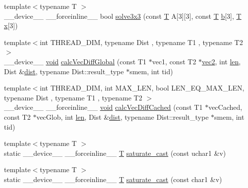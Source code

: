 \begin{DoxyCompactItemize}
\item 
{\footnotesize template$<$typename T $>$ }\\\-\_\-\-\_\-device\-\_\-\-\_\- \-\_\-\-\_\-forceinline\-\_\-\-\_\- bool \hyperlink{namespacecv_1_1gpu_1_1device_af782a2bb1e3615216baf919623438b82}{solve3x3} (const \hyperlink{calib3d_8hpp_a3efb9551a871ddd0463079a808916717}{T} A\mbox{[}3\mbox{]}\mbox{[}3\mbox{]}, const \hyperlink{calib3d_8hpp_a3efb9551a871ddd0463079a808916717}{T} \hyperlink{legacy_8hpp_ac04272e8ca865b8fba18d36edae9fd2a}{b}\mbox{[}3\mbox{]}, \hyperlink{calib3d_8hpp_a3efb9551a871ddd0463079a808916717}{T} \hyperlink{highgui__c_8h_a6150e0515f7202e2fb518f7206ed97dc}{x}\mbox{[}3\mbox{]})
\item 
{\footnotesize template$<$int T\-H\-R\-E\-A\-D\-\_\-\-D\-I\-M, typename Dist , typename T1 , typename T2 $>$ }\\\-\_\-\-\_\-device\-\_\-\-\_\- \hyperlink{legacy_8hpp_a8bb47f092d473522721002c86c13b94e}{void} \hyperlink{namespacecv_1_1gpu_1_1device_af80d88a6c643e38c5b2087b600cfa236}{calc\-Vec\-Diff\-Global} (const T1 $\ast$vec1, const T2 $\ast$\hyperlink{core__c_8h_aa709adb546262d915d3c98aacf3bb71a}{vec2}, int \hyperlink{core__c_8h_accb79be93f4fbcaa15b5a7670569c9f8}{len}, Dist \&\hyperlink{legacy_8hpp_ae895c2003a87eda49126845b7ac3688e}{dist}, typename Dist\-::result\-\_\-type $\ast$smem, int tid)
\item 
{\footnotesize template$<$int T\-H\-R\-E\-A\-D\-\_\-\-D\-I\-M, int M\-A\-X\-\_\-\-L\-E\-N, bool L\-E\-N\-\_\-\-E\-Q\-\_\-\-M\-A\-X\-\_\-\-L\-E\-N, typename Dist , typename T1 , typename T2 $>$ }\\\-\_\-\-\_\-device\-\_\-\-\_\- \-\_\-\-\_\-forceinline\-\_\-\-\_\- \hyperlink{legacy_8hpp_a8bb47f092d473522721002c86c13b94e}{void} \hyperlink{namespacecv_1_1gpu_1_1device_aa65ed7257421dae386ffd02f9dbd9de5}{calc\-Vec\-Diff\-Cached} (const T1 $\ast$vec\-Cached, const T2 $\ast$vec\-Glob, int \hyperlink{core__c_8h_accb79be93f4fbcaa15b5a7670569c9f8}{len}, Dist \&\hyperlink{legacy_8hpp_ae895c2003a87eda49126845b7ac3688e}{dist}, typename Dist\-::result\-\_\-type $\ast$smem, int tid)
\item 
{\footnotesize template$<$typename T $>$ }\\static \-\_\-\-\_\-device\-\_\-\-\_\- \-\_\-\-\_\-forceinline\-\_\-\-\_\- \hyperlink{calib3d_8hpp_a3efb9551a871ddd0463079a808916717}{T} \hyperlink{namespacecv_1_1gpu_1_1device_afa45916a894fc2d2df4ab073caf18ae3}{saturate\-\_\-cast} (const uchar1 \&v)
\item 
{\footnotesize template$<$typename T $>$ }\\static \-\_\-\-\_\-device\-\_\-\-\_\- \-\_\-\-\_\-forceinline\-\_\-\-\_\- \hyperlink{calib3d_8hpp_a3efb9551a871ddd0463079a808916717}{T} \hyperlink{namespacecv_1_1gpu_1_1device_a229a206ba6346bbdc9716877a3f87d66}{saturate\-\_\-cast} (const char1 \&v)

\end{DoxyCompactItemize}
